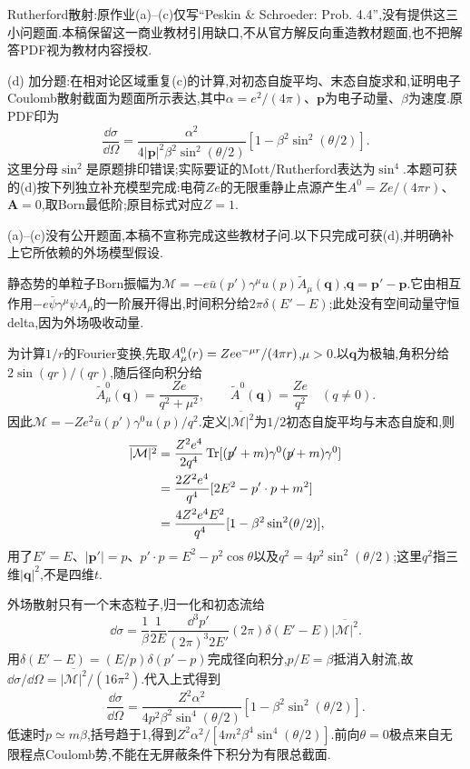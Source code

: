 \begin{exercise}
Rutherford散射:原作业(a)–(c)仅写“Peskin \& Schroeder: Prob. 4.4”,没有提供这三小问题面.本稿保留这一商业教材引用缺口,不从官方解反向重造教材题面,也不把解答PDF视为教材内容授权.

(d) 加分题:在相对论区域重复(c)的计算,对初态自旋平均、末态自旋求和,证明电子Coulomb散射截面为题面所示表达,其中$\alpha=e^2/(4\pi)$、$\mathbf p$为电子动量、$\beta$为速度.原PDF印为
\[
 \frac{\dd\sigma}{\dd\Omega}=\frac{\alpha^2}{4|\mathbf p|^2\beta^2\sin^2(\theta/2)}
 [1-\beta^2\sin^2(\theta/2)].
\]
这里分母$\sin^2$是原题排印错误;实际要证的Mott/Rutherford表达为$\sin^4$.本题可获的(d)按下列独立补充模型完成:电荷$Ze$的无限重静止点源产生$A^0=Ze/(4\pi r)$、$\mathbf A=0$,取Born最低阶;原目标式对应$Z=1$.
\end{exercise}
\begin{solution}
(a)–(c)没有公开题面,本稿不宣称完成这些教材子问.以下只完成可获(d),并明确补上它所依赖的外场模型假设.

静态势的单粒子Born振幅为$\mathcal M=-e\bar u(p')\gamma^\mu u(p)\widetilde A_\mu(\mathbf q)$,$\mathbf q=\mathbf p'-\mathbf p$.它由相互作用$-e\bar\psi\gamma^\mu\psi A_\mu$的一阶展开得出,时间积分给$2\pi\delta(E'-E)$;此处没有空间动量守恒delta,因为外场吸收动量.

为计算$1/r$的Fourier变换,先取$A^0_\mu(r)=Ze\mathrm e^{-\mu r}/(4\pi r)$,$\mu>0$.以$\mathbf q$为极轴,角积分给$2\sin(qr)/(qr)$,随后径向积分给
\[
 \widetilde A^0_\mu(\mathbf q)=\frac{Ze}{q^2+\mu^2},\qquad
 \widetilde A^0(\mathbf q)=\frac{Ze}{q^2}\quad(q\ne0).
\]
因此$\mathcal M=-Ze^2\bar u(p')\gamma^0u(p)/q^2$.定义$\overline{|\mathcal M|^2}$为$1/2$初态自旋平均与末态自旋和,则
\begin{align*}
 \overline{|\mathcal M|^2}
 &=\frac{Z^2e^4}{2q^4}\operatorname{Tr}[(\mathord{\not\mathrel{p}}'+m)\gamma^0(\mathord{\not\mathrel{p}}+m)\gamma^0]\\
 &=\frac{2Z^2e^4}{q^4}[2E^2-p'\cdot p+m^2]\\
 &=\frac{4Z^2e^4 E^2}{q^4}[1-\beta^2\sin^2(\theta/2)],
\end{align*}
用了$E'=E$、$|\mathbf p'|=p$、$p'\cdot p=E^2-p^2\cos\theta$以及$q^2=4p^2\sin^2(\theta/2)$;这里$q^2$指三维$|\mathbf q|^2$,不是四维$t$.

外场散射只有一个末态粒子,归一化和初态流给
\[
 \dd\sigma=\frac1\beta\frac1{2E}\frac{\dd^3p'}{(2\pi)^3 2E'}
 (2\pi)\delta(E'-E)\overline{|\mathcal M|^2}.
\]
用$\delta(E'-E)=(E/p)\delta(p'-p)$完成径向积分,$p/E=\beta$抵消入射流,故$\dd\sigma/\dd\Omega=\overline{|\mathcal M|^2}/(16\pi^2)$.代入上式得到
\[
 \boxed{\frac{\dd\sigma}{\dd\Omega}
 =\frac{Z^2\alpha^2}{4p^2\beta^2\sin^4(\theta/2)}
 [1-\beta^2\sin^2(\theta/2)]}.
\]
低速时$p\simeq m\beta$,括号趋于1,得到$Z^2\alpha^2/[4m^2\beta^4\sin^4(\theta/2)]$.前向$\theta=0$极点来自无限程点Coulomb势,不能在无屏蔽条件下积分为有限总截面.
\end{solution}

